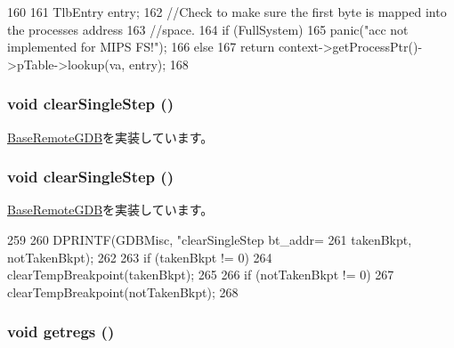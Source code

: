\begin{DoxyCode}
160 {
161     TlbEntry entry;
162     //Check to make sure the first byte is mapped into the processes address
163     //space.
164     if (FullSystem)
165         panic("acc not implemented for MIPS FS!");
166     else
167         return context->getProcessPtr()->pTable->lookup(va, entry);
168 }
\end{DoxyCode}
\hypertarget{classMipsISA_1_1RemoteGDB_afd89268069d9026378b06b08c97f65f8}{
\subsubsection[{clearSingleStep}]{\setlength{\rightskip}{0pt plus 5cm}void clearSingleStep ()}}
\label{classMipsISA_1_1RemoteGDB_afd89268069d9026378b06b08c97f65f8}


\hyperlink{classBaseRemoteGDB_a69f1887d1310ab6f19cf5bbcdf9d7a1e}{BaseRemoteGDB}を実装しています。\hypertarget{classMipsISA_1_1RemoteGDB_afd89268069d9026378b06b08c97f65f8}{
\subsubsection[{clearSingleStep}]{\setlength{\rightskip}{0pt plus 5cm}void clearSingleStep ()}}
\label{classMipsISA_1_1RemoteGDB_afd89268069d9026378b06b08c97f65f8}


\hyperlink{classBaseRemoteGDB_a69f1887d1310ab6f19cf5bbcdf9d7a1e}{BaseRemoteGDB}を実装しています。


\begin{DoxyCode}
259 {
260     DPRINTF(GDBMisc, "clearSingleStep bt_addr=%
261             takenBkpt, notTakenBkpt);
262 
263     if (takenBkpt != 0)
264         clearTempBreakpoint(takenBkpt);
265 
266     if (notTakenBkpt != 0)
267         clearTempBreakpoint(notTakenBkpt);
268 }
\end{DoxyCode}
\hypertarget{classMipsISA_1_1RemoteGDB_a62bc8adc5a48f1cbb5eb9bb64301d38d}{
\subsubsection[{getregs}]{\setlength{\rightskip}{0pt plus 5cm}void getregs ()}}
\label{classMipsISA_1_1RemoteGDB_a62bc8adc5a48f1cbb5eb9bb64301d38d}


